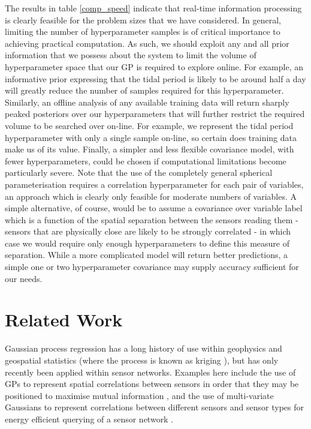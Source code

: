 \documentclass{acmtrans2m}
\begin{document}
The results in table \ref{comp_speed} indicate that real-time information processing is clearly feasible for the problem sizes that we have considered. In general, limiting the number of hyperparameter samples is of critical importance to achieving practical computation. As such, we should exploit any and all prior information that we possess about the system to limit the volume of hyperparameter space that our GP is required to explore online. For example, an informative prior expressing that the tidal period is likely to be around half a day will greatly reduce the number of samples required for this hyperparameter. Similarly, an offline analysis of any available training data will return sharply peaked posteriors over our hyperparameters that will further restrict the required volume to be searched over on-line. For example, we represent the tidal period hyperparameter with only a single sample on-line, so certain does training data make us of its value. Finally, a simpler and less flexible covariance model, with fewer hyperparameters, could be chosen if computational limitations become particularly severe. Note that the use of the completely general spherical parameterisation requires a correlation hyperparameter for each pair of variables, an approach which is clearly only feasible for moderate numbers of variables. A simple alternative, of course, would be to assume a covariance over variable label which is a function of the spatial separation between the sensors reading them - sensors that are physically close are likely to be strongly correlated - in which case we would require only enough hyperparameters to define this measure of separation. While a more complicated model will return better predictions, a simple one or two hyperparameter covariance may supply accuracy sufficient for our needs.


\section{Related Work}\label{sec_related}

\noindent Gaussian process regression has a long history of use within geophysics and geospatial statistics (where the process is known as kriging \cite{cressie}), but has only recently been applied within sensor networks. Examples here include the use of GPs to represent spatial correlations between sensors in order that they may be positioned to maximise mutual information \cite{guestrin1}, and the use of multi-variate Gaussians to represent correlations between different sensors and sensor types for energy efficient querying of a sensor network \cite{guestrin2}. 
\end{document}
